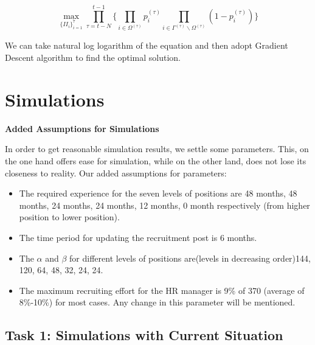 \documentclass[tcn = 37075, sheet = false, abstract = false]{mcmthesis}
\begin{document}
$$\max\limits_{\{II_i\}_{i=1}^7} \prod\limits_{\tau=t-N}^{t-1}\{\prod\limits_{i \in \Omega^{(\tau)}} p_i^{(\tau)} \prod_{i\in \Gamma^{(\tau)}\backslash \Omega^{(\tau)}}(1-p_i^{(\tau)}) \}$$

We can take natural log logarithm of the equation and then adopt Gradient Descent algorithm to find the optimal solution. 



\section{Simulations}

\textbf{Added Assumptions for Simulations}

In order to get reasonable simulation results, we settle some parameters. This, on the one hand offers ease for simulation, while on the other land, does not lose its closeness to reality. Our added assumptions for parameters:
\begin{itemize}
\item The required experience for the seven levels of positions are 48 months, 48 months, 24 months, 24 months, 12 months, 0 month respectively (from higher position to lower position).
\item The time period for updating the recruitment post is 6 months.
\item The $\alpha$ and $\beta$ for different levels of positions are(levels in decreasing order)144, 120, 64, 48, 32, 24, 24.
\item The maximum recruiting effort for the HR manager is 9\% of 370 (average of 8\%-10\%) for most cases. Any change in this parameter will be mentioned.
\end{itemize}

\subsection{Task 1: Simulations with Current Situation}
\end{document}
